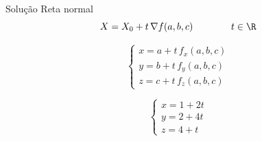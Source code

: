 \begin{resolution}{Solução}
  Reta normal
  \pause
  \[
    X = X_0 + t\,\nabla f(a, b, c)
    \qquad\qquad
    t \in \R
  \]

  \pause
  \[
    \begin{cases}
      x = a + t\,f_x(a, b, c) \\
      y = b + t\,f_y(a, b, c) \\
      z = c + t\,f_z(a, b, c)
    \end{cases}
  \]

  \pause
  \[
    \begin{cases}
      x = 1 + 2t \\
      y = 2 + 4t \\
      z = 4 + t
    \end{cases}
  \]
\end{resolution}

